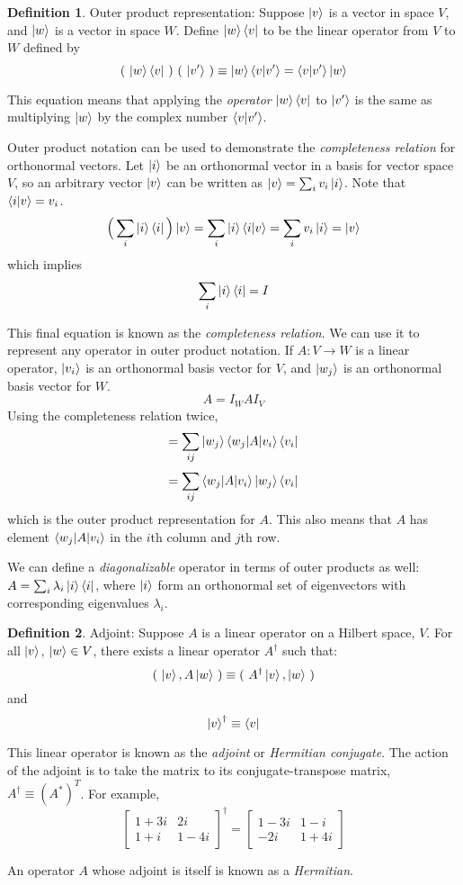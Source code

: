 \documentclass[letterpaper]{article}
\theoremstyle{definition}
\newtheorem{definition}{Definition}[section]
\begin{document}
\begin{definition}{Outer product representation: }
Suppose $\ket{v}$ is a vector in space $V$, and $\ket{w}$ is a vector in space $W$. Define $\ket{w} \bra{v}$ to be the linear operator from $V$ to $W$ defined by 
$$ (\ \ket{w} \bra{v}\ ) \ (\ \ket{v'}\ ) \equiv \ket{w} \braket{v|v'} = \braket{v|v'} \ket{w}$$

This equation means that applying the \textit{operator} $\ket{w} \bra{v}$ to $\ket{v'}$ is the same as multiplying $\ket{w}$ by the complex number $\braket{v|v'}$. 

Outer product notation can be used to demonstrate the \textit{completeness relation} for orthonormal vectors. Let $\ket{i}$ be an orthonormal vector in a basis for vector space $V$, so an arbitrary vector $\ket{v}$ can be written as $\ket{v} = \sum_{i} v_{i} \ket{i}$. Note that $\braket{i|v} = v_i$. 
$$\Big( \sum_i \ket{i} \bra{i} \Big) \ket{v} = \sum_i \ket{i} \braket{i|v} = \sum_i v_{i} \ket{i} = \ket{v} $$
which implies 
$$\sum_i \ket{i} \bra{i} = I$$

This final equation is known as the \textit{completeness relation}. We can use it to represent any operator in outer product notation. If $A: V \rightarrow W$ is a linear operator, $\ket{v_i}$ is an orthonormal basis vector for $V$, and $\ket{w_j}$ is an orthonormal basis vector for $W$. 
$$A = I_{W} A I_{V}$$
Using the completeness relation twice, 
$$= \sum_{ij} \ket{w_j} \braket{w_j | A | v_i} \bra{v_i}$$
$$= \sum_{ij} \braket{w_j | A | v_i} \ket{w_j} \bra{v_i}$$
which is the outer product representation for $A$. This also means that $A$ has element $\braket{w_j | A | v_i}$ in the $i$th column and $j$th row. 

We can define a \textit{diagonalizable} operator in terms of outer products as well: $A = \sum_{i} \lambda_{i} \ket{i} \bra{i}$, where $\ket{i}$ form an orthonormal set of eigenvectors with corresponding eigenvalues $\lambda_{i}$. 
\end{definition}

\begin{definition}{Adjoint: }
Suppose $A$ is a linear operator on a Hilbert space, $V$. For all $\ket{v}$, $\ket{w} \in V$, there exists a linear operator $A^{\dagger}$ such that:
$$( \ \ket{v}, A \ket{w} \ ) \equiv ( \ A^{\dagger} \ket{v}, \ket{w} \ )$$ 
and 
$$ \ket{v}^{\dagger} \equiv \bra{v}$$

This linear operator is known as the \textit{adjoint} or \textit{Hermitian conjugate}. The action of the adjoint is to take the matrix to its conjugate-transpose matrix, $A^{\dagger} \equiv (A^{*})^{T}$. For example, 
$$\begin{bmatrix}
1 + 3i & 2i \\
1 + i & 1 - 4i
\end{bmatrix}^{\dagger} = \begin{bmatrix}
1 - 3i & 1 - i \\
-2i & 1 + 4i
\end{bmatrix}$$

An operator $A$ whose adjoint is itself is known as a \textit{Hermitian}.
\end{definition}
\end{document}
